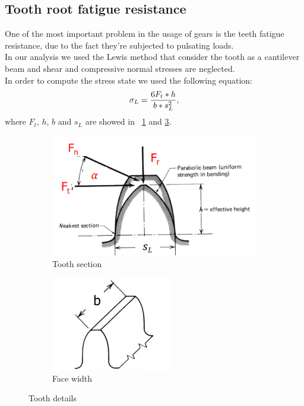 \subsection{Tooth root fatigue resistance}
One of the most important problem in the usage of gears is the teeth fatigue resistance, due to the fact they're subjected to pulsating loads.\\
In our analysis we used the Lewis method that consider the tooth as a cantilever beam and shear and compressive normal stresses are neglected.\\
In order to compute the stress state we used the following equation:
\begin{equation}
	\centering
	\sigma_L=\frac{6F_t*h}{b*s_L^2},
	\label{stress}
\end{equation}
where $F_t$, $h$, $b$ and $s_L$ are showed in \figurename \ \ref{fig:tooth1} and \ref{fig:tooth2}.
\begin{figure}[hbt]
\begin{subfigure}{.5\textwidth}
	\centering
	\includegraphics[scale=0.5]{Images/toothgear1.png}
	\caption{Tooth section}
	\label{fig:tooth1}
\end{subfigure}%
\begin{subfigure}{.5\textwidth}
	\centering
	\includegraphics[scale=0.6]{Images/toothgear2.png}
	\caption{Face width}
	\label{fig:tooth2}
\end{subfigure}
\caption{Tooth details}
\end{figure}\\
